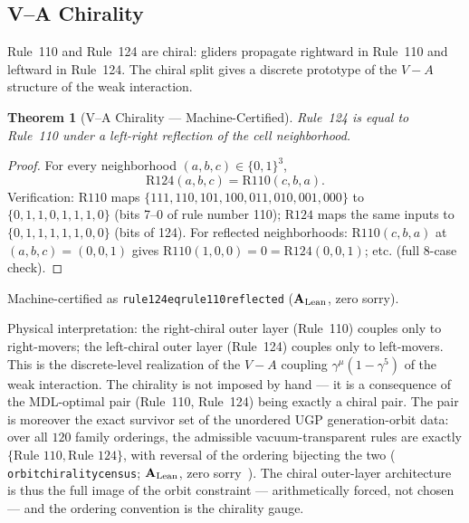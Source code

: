 \documentclass[11pt]{article}
\newtheorem{theorem}{Theorem}[section]
\theoremstyle{remark}
\newcommand{\lean}[1]{%
  \penalty-100
  \begingroup\def\_{\textunderscore\allowbreak}\texttt{#1}\endgroup}
\newcommand{\CatAL}{\ensuremath{\textbf{A}_{\rm Lean}}}
\begin{document}
\subsection{V--A Chirality}

Rule~110 and Rule~124 are chiral: gliders propagate rightward in Rule~110
and leftward in Rule~124. The chiral split gives a discrete prototype of the
$V{-}A$ structure of the weak interaction.

\begin{theorem}[V--A Chirality --- Machine-Certified]
Rule~124 is equal to Rule~110 under a left-right reflection of the cell
neighborhood.
\end{theorem}
\begin{proof}
For every neighborhood $(a, b, c) \in \{0,1\}^3$,
\[
  \mathrm{R124}(a, b, c) = \mathrm{R110}(c, b, a).
\]
Verification: $\mathrm{R110}$ maps $\{111,110,101,100,011,010,001,000\}$
to $\{0,1,1,0,1,1,1,0\}$ (bits 7--0 of rule number 110);
$\mathrm{R124}$ maps the same inputs to $\{0,1,1,1,1,1,0,0\}$ (bits of 124).
For reflected neighborhoods: $\mathrm{R110}(c,b,a)$ at $(a,b,c) = (0,0,1)$
gives $\mathrm{R110}(1,0,0) = 0 = \mathrm{R124}(0,0,1)$; etc. (full 8-case
check).
\end{proof}
Machine-certified as \lean{rule124\_eq\_rule110\_reflected}
($\CatAL$, zero sorry).

\noindent Physical interpretation: the right-chiral outer layer
(Rule~110) couples only to right-movers; the left-chiral outer layer
(Rule~124) couples only to left-movers. This is the discrete-level
realization of the $V{-}A$ coupling $\gamma^\mu(1-\gamma^5)$ of the
weak interaction. The chirality is not imposed by hand — it is a
consequence of the MDL-optimal pair (Rule~110, Rule~124) being exactly a
chiral pair. The pair is moreover the exact survivor set of the unordered
UGP generation-orbit data: over all $120$ family orderings, the admissible
vacuum-transparent rules are exactly $\{\text{Rule~110}, \text{Rule~124}\}$,
with reversal of the ordering bijecting the two
(\lean{orbit\_chirality\_census}; $\CatAL$, zero
sorry~\cite{SpivackGTEPolynomialWolfram,SpivackGTECompleteFramework}).
The chiral outer-layer architecture is thus the full image of the orbit
constraint — arithmetically forced, not chosen — and the ordering convention
is the chirality gauge.
\end{document}
